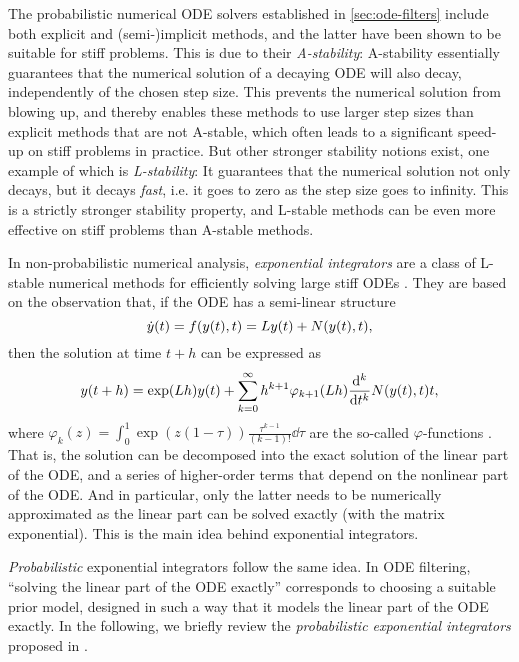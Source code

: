 \documentclass{mimosis}
\begin{document}
The probabilistic numerical ODE solvers established in
\cref{sec:ode-filters}
include both explicit and (semi-)implicit methods, and the latter have been shown to be suitable for stiff problems.
This is due to their \emph{A-stability}:
A-stability essentially guarantees that the numerical solution of a decaying ODE will also decay, independently of the chosen step size.
This prevents the numerical solution from blowing up, and thereby enables these methods to use larger step sizes than explicit methods that are not A-stable, which often leads to a significant speed-up on stiff problems in practice.
But other stronger stability notions exist, one example of which is \emph{L-stability}:
It guarantees that the numerical solution not only decays, but it decays \emph{fast}, i.e. it goes to zero as the step size goes to infinity.
This is a strictly stronger stability property, and L-stable methods can be even more effective on stiff problems than A-stable methods.

In non-probabilistic numerical analysis, \emph{exponential integrators} are a class of L-stable numerical methods for efficiently solving large stiff ODEs
\parencite{VanLoan1978,hochbruck1998exponential,cox2002exponential,hochbruck_ostermann_2010}.
They are based on the observation that, if the ODE has a semi-linear structure
\begin{equation}
  \label{eq:ivp:semilinear}
  \dot{\val}(t) = \vf(\val(t), t) = L \val(t) + N(\val(t), t),
\end{equation}
then the solution at time \(t+h\) can be expressed as
\begin{equation}
  y(t+h)= \exp(Lh) y(t) + \sum_{k=0}^\infty   h^{k+1} \varphi_{k + 1}(Lh) \dv[k]{}{t} {N(y(t),t)}{t},
\end{equation}
where
\(\varphi_k(z) = \int_0^1 \exp(z(1- \tau)) \frac{\tau^{k-1}}{(k-1)!} \dd \tau\)
are the so-called \(\varphi\)-functions
\parencite{hochbruck_ostermann_2010}.
That is, the solution can be decomposed into the exact solution of the linear part of the ODE, and a series of higher-order terms that depend on the nonlinear part of the ODE.
And in particular, only the latter needs to be numerically approximated as the linear part can be solved exactly (with the matrix exponential).
This is the main idea behind exponential integrators.

\emph{Probabilistic} exponential integrators follow the same idea.
In ODE filtering, ``solving the linear part of the ODE exactly'' corresponds to choosing a suitable prior model,
designed in such a way that it models the linear part of the ODE exactly.
In the following, we briefly review the \emph{probabilistic exponential integrators} proposed in
\probexpint{}.
\end{document}
